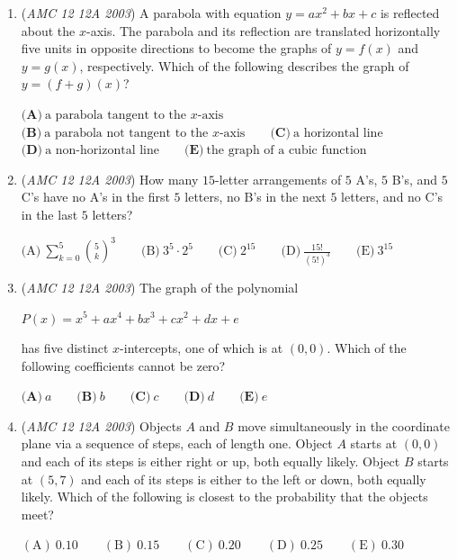 \begin{enumerate}
 $\mathrm{(A) \ } 8180\qquad \mathrm{(B) \ } 8181\qquad \mathrm{(C) \ } 8182\qquad \mathrm{(D) \ } 9000\qquad \mathrm{(E) \ } 9090$


	\item (\textit{AMC 12 12A 2003}) A parabola with equation $y=ax^2+bx+c$ is reflected about the $x$-axis. The parabola and its reflection are translated horizontally five units in opposite directions to become the graphs of $y=f(x)$ and $y=g(x)$, respectively. Which of the following describes the graph of $y=(f+g)(x)$?


 $\textbf{(A)}\ \text{a parabola tangent to the }x\text{-axis}$
$\textbf{(B)}\ \text{a parabola not tangent to the }x\text{-axis}\qquad\textbf{(C)}\ \text{a horizontal line}$
$\textbf{(D)}\ \text{a non-horizontal line}\qquad\textbf{(E)}\ \text{the graph of a cubic function}$


	\item (\textit{AMC 12 12A 2003}) How many $15$-letter arrangements of $5$ A's, $5$ B's, and $5$ C's have no A's in the first $5$ letters, no B's in the next $5$ letters, and no C's in the last $5$ letters?


 $\textrm{(A)}\ \sum_{k=0}^{5}\binom{5}{k}^{3}\qquad\textrm{(B)}\ 3^{5}\cdot 2^{5}\qquad\textrm{(C)}\ 2^{15}\qquad\textrm{(D)}\ \frac{15!}{(5!)^{3}}\qquad\textrm{(E)}\ 3^{15}$


	\item (\textit{AMC 12 12A 2003}) The graph of the polynomial


 $P(x) = x^5 + ax^4 + bx^3 + cx^2 + dx + e$


 has five distinct $x$-intercepts, one of which is at $(0,0)$. Which of the following coefficients cannot be zero?


 $\textbf{(A)}\ a \qquad \textbf{(B)}\ b \qquad \textbf{(C)}\ c \qquad \textbf{(D)}\ d \qquad \textbf{(E)}\ e$


	\item (\textit{AMC 12 12A 2003}) Objects $A$ and $B$ move simultaneously in the coordinate plane via a sequence of steps, each of length one. Object $A$ starts at $(0,0)$ and each of its steps is either right or up, both equally likely. Object $B$ starts at $(5,7)$ and each of its steps is either to the left or down, both equally likely. Which of the following is closest to the probability that the objects meet?


 $\mathrm{(A)} \ 0.10 \qquad \mathrm{(B)} \ 0.15 \qquad \mathrm{(C)} \ 0.20 \qquad \mathrm{(D)} \ 0.25 \qquad \mathrm{(E)} \ 0.30 \qquad$



\end{enumerate}
